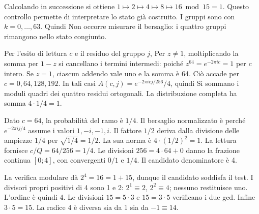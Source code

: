 
Calcolando in successione si ottiene \(1\mapsto2\mapsto4\mapsto8\mapsto16\bmod15=1\). Questo controllo permette di interpretare lo stato già costruito. I gruppi sono
con \(k=0,\ldots,63\). Quindi
Non occorre misurare il bersaglio: i quattro gruppi rimangono nello stato congiunto.


Per l’esito di lettura \(c\) e il residuo del gruppo \(j\),
Per \(z\ne1\), moltiplicando la somma per \(1-z\) si cancellano i termini intermedi:
poiché \(z^{64}=e^{-2\pi ic}=1\) per \(c\) intero. Se \(z=1\), ciascun addendo vale uno e la somma è 64. Ciò accade per \(c=0,64,128,192\). In tali casi \(A(c,j)=e^{-2\pi icj/256}/4\), quindi
Si sommano i moduli quadri dei quattro residui ortogonali. La distribuzione completa ha somma \(4\cdot1/4=1\).


Dato \(c=64\), la probabilità del ramo è \(1/4\). Il bersaglio normalizzato è
perché \(e^{-2\pi ij/4}\) assume i valori \(1,-i,-1,i\). Il fattore \(1/2\) deriva dalla divisione delle ampiezze \(1/4\) per \(\sqrt{1/4}=1/2\). La sua norma è \(4\cdot(1/2)^2=1\).
La lettura fornisce \(c/Q=64/256=1/4\). Le divisioni \(256=4\cdot64+0\) danno la frazione continua \([0;4]\), con convergenti \(0/1\) e \(1/4\). Il candidato denominatore è 4.


La verifica modulare dà \(2^4=16=1+15\), dunque il candidato soddisfa il test. I divisori propri positivi di 4 sono 1 e 2: \(2^1\equiv2\), \(2^2\equiv4\); nessuno restituisce uno. L’ordine è quindi 4.
Le divisioni \(15=5\cdot3\) e \(15=3\cdot5\) verificano i due gcd. Infine \(3\cdot5=15\). La radice 4 è diversa sia da 1 sia da \(-1\equiv14\).

